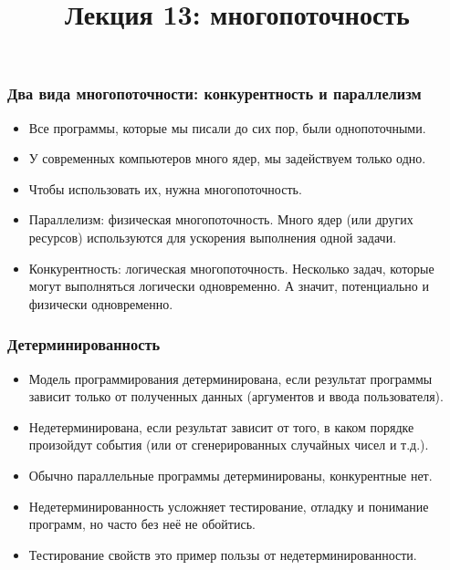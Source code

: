 \documentclass[11pt]{beamer}
\title{Лекция 13: многопоточность}
\begin{document}
\begin{frame}[plain]
    \maketitle
\end{frame}

\begin{frame}[fragile]
\frametitle{Два вида многопоточности: конкурентность и параллелизм}
\begin{itemize}
    \item Все программы, которые мы писали до сих пор, были однопоточными.
    \item У современных компьютеров много ядер, мы задействуем только одно.
    \item Чтобы использовать их, нужна многопоточность. \pause
    \item Параллелизм: физическая многопоточность. Много ядер (или других ресурсов) используются для ускорения выполнения одной задачи. \pause
    \item Конкурентность: логическая многопоточность. Несколько задач, которые могут выполняться логически одновременно. А значит, потенциально и физически одновременно.
\end{itemize}
\end{frame}

\begin{frame}[fragile]
\frametitle{Детерминированность}
\begin{itemize}
    \item Модель программирования детерминирована, если результат программы зависит только от полученных данных (аргументов и ввода пользователя). \pause
    \item Недетерминирована, если результат зависит от того, в каком порядке произойдут события (или от сгенерированных случайных чисел и т.д.). \pause
    \item Обычно параллельные программы детерминированы, конкурентные нет.
    \item Недетерминированность усложняет тестирование, отладку и понимание программ, но часто без неё не обойтись.
    \item Тестирование свойств это пример пользы от недетерминированности.
\end{itemize}
\end{frame}
\end{document}
